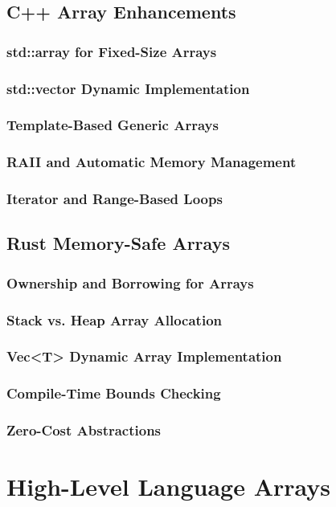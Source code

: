 \documentclass[12pt, oneside]{book}
\begin{document}
\subsection{C++ Array Enhancements}
\subsubsection{std::array for Fixed-Size Arrays}
\subsubsection{std::vector Dynamic Implementation}
\subsubsection{Template-Based Generic Arrays}
\subsubsection{RAII and Automatic Memory Management}
\subsubsection{Iterator and Range-Based Loops}

\subsection{Rust Memory-Safe Arrays}
\subsubsection{Ownership and Borrowing for Arrays}
\subsubsection{Stack vs. Heap Array Allocation}
\subsubsection{Vec<T> Dynamic Array Implementation}
\subsubsection{Compile-Time Bounds Checking}
\subsubsection{Zero-Cost Abstractions}

\section{High-Level Language Arrays}
\end{document}
